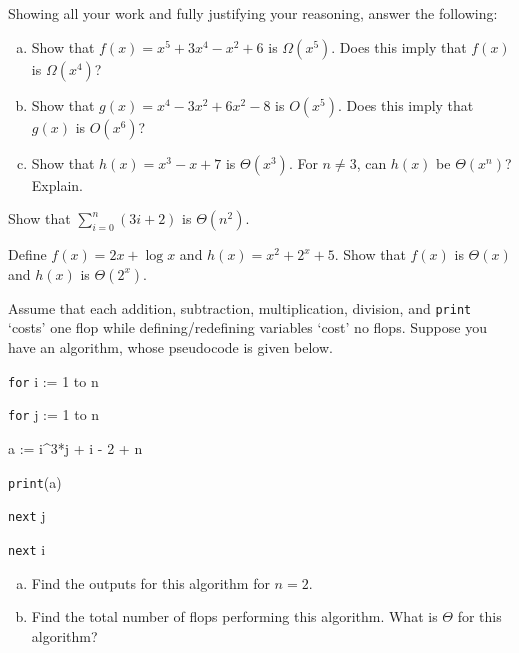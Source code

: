 \documentclass[11pt,letterpaper]{article}
\begin{document}

 Showing all your work and fully justifying your reasoning, answer the following:
	\begin{enumerate}[(a)]
	\item Show that $f(x)= x^5 + 3x^4 - x^2 + 6$ is $\Omega(x^5)$. Does this imply that $f(x)$ is $\Omega(x^4)$?
	\item Show that $g(x)= x^4 - 3x^2 + 6x^2 - 8$ is $O(x^5)$. Does this imply that $g(x)$ is $O(x^6)$?
	\item Show that $h(x)= x^3 - x + 7$ is $\Theta(x^3)$. For $n \neq 3$, can $h(x)$ be $\Theta(x^n)$? Explain. 
	\end{enumerate}



\newpage



 Show that $\displaystyle \sum_{i= 0}^n (3i + 2)$ is $\Theta(n^2)$. 



\newpage



 Define $f(x)= 2x + \log x$ and $h(x)= x^2 + 2^x + 5$. Show that $f(x)$ is $\Theta(x)$ and $h(x)$ is $\Theta(2^x)$. 



\newpage



 Assume that each addition, subtraction, multiplication, division, and \texttt{print} `costs' one flop while defining/redefining variables `cost' no flops. Suppose you have an algorithm, whose pseudocode is given below. \pspace

\hspace{1cm} \texttt{for} i := 1 to n \par
\hspace{1.5cm} \texttt{for} j := 1 to n \par
\hspace{2cm} a := i\^{}3*j + i - 2 + n \par
\hspace{2cm} \texttt{print}(a) \par
\hspace{1.5cm} \texttt{next} j \par
\hspace{1cm} \texttt{next} i \pspace

\begin{enumerate}[(a)]
\item Find the outputs for this algorithm for $n= 2$.
\item  Find the total number of flops performing this algorithm. What is $\Theta$ for this algorithm? 
\end{enumerate}
\end{document}
